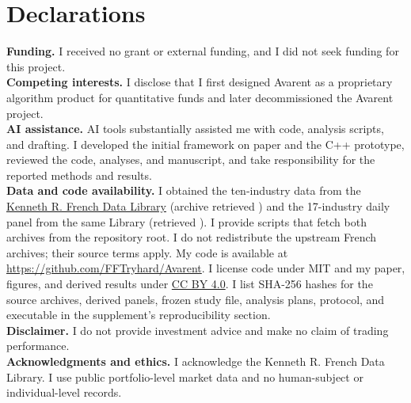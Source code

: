 \documentclass[11pt]{article}
\begin{document}
\section*{Declarations}
\noindent\textbf{Funding.} I received no grant or external funding, and I did not seek funding for this project.\\
\textbf{Competing interests.} I disclose that I first designed Avarent as a proprietary algorithm product for quantitative funds and later decommissioned the Avarent project.\\
\textbf{AI assistance.} AI tools substantially assisted me with code, analysis scripts, and drafting. I developed the initial framework on paper and the C++ prototype, reviewed the code, analyses, and manuscript, and take responsibility for the reported methods and results.\\
\textbf{Data and code availability.} I obtained the ten-industry data from the \href{https://mba.tuck.dartmouth.edu/pages/faculty/ken.french/data_library.html}{Kenneth R. French Data Library} (archive retrieved \RetrievalDate) and the 17-industry daily panel from the same Library (retrieved \SecondaryRetrievalDate). I provide scripts that fetch both archives from the repository root. I do not redistribute the upstream French archives; their source terms apply. My code is available at \url{https://github.com/FFTryhard/Avarent}. I license code under MIT and my paper, figures, and derived results under \href{https://creativecommons.org/licenses/by/4.0/}{CC BY 4.0}. I list SHA-256 hashes for the source archives, derived panels, frozen study file, analysis plans, protocol, and executable in the supplement's reproducibility section.\\
\textbf{Disclaimer.} I do not provide investment advice and make no claim of trading performance.\\
\textbf{Acknowledgments and ethics.} I acknowledge the Kenneth R. French Data Library. I use public portfolio-level market data and no human-subject or individual-level records.
\end{document}

